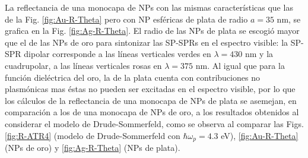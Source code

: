 La reflectancia de una monocapa de NPs con las mismas características que las de la Fig. \ref{fig:Au-R-Theta} pero con NP esféricas de plata de radio $a=35$ nm, se grafica en la Fig. \ref{fig:Ag-R-Theta}. El radio de las NPs de plata se escogió mayor que el de las NPs de oro para sintonizar las SP-SPRs en el espectro visible: la SP-SPR dipolar corresponde a las líneas verticales verdes en $\lambda=430$ nm y la cuadrupolar, a las líneas verticales rosas en $\lambda=375$ nm. Al igual que para la función dieléctrica del oro, la de la plata cuenta con contribuciones no plasmónicas mas éstas no pueden ser excitadas en el espectro visible, por lo que los cálculos de la reflectancia de una monocapa de NPs de plata se asemejan, en comparación a los de una monocapa de NPs de oro, a los resultados obtenidos al considerar el modelo de Drude-Sommerfeld, como se observa al comparar las Figs. \ref{fig:R-ATR4} (modelo de Drude-Sommerfeld con $\hbar\omega_p=4.3$ eV), \ref{fig:Au-R-Theta} (NPs de oro) y \ref{fig:Ag-R-Theta} (NPs de plata).

